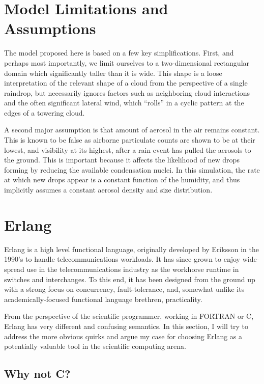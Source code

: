 \documentclass[twocolumn,a4paper,10pt]{article}
\begin{document}
\section{Model Limitations and Assumptions}

The model proposed here is based on a few key simplifications. First, and
perhaps most importantly, we limit ourselves to a two-dimensional rectangular
domain which significantly taller than it is wide. This shape is a loose
interpretation of the relevant shape of a cloud from the perspective of a single
raindrop, but necessarily ignores factors such as neighboring cloud
interactions and the often significant lateral wind, which ``rolls'' in a cyclic
pattern at the edges of a towering cloud.

A second major assumption is that amount of aerosol in the air remains constant.
This is known to be false as airborne particulate counts are shown to be at
their lowest, and visibility at its highest, after a rain event has pulled the
aerosols to the ground. This is important because it affects the likelihood of
new drops forming by reducing the available condensation nuclei. In this
simulation, the rate at which new drops appear is a constant function of the
humidity, and thus implicitly assumes a constant aerosol density and size
distribution.


\section{Erlang}

Erlang is a high level functional language, originally developed by Eriksson in
the 1990's to handle telecommunications workloads. It has since grown to enjoy
wide-spread use in the telecommunications industry as the workhorse runtime in
switches and interchanges. To this end, it has been designed from the ground up
with a strong focus on concurrency, fault-tolerance, and, somewhat unlike its
academically-focused functional language brethren, practicality.

From the perspective of the scientific programmer, working in FORTRAN or C,
Erlang has very different and confusing semantics. In this section, I will try
to address the more obvious quirks and argue my case for choosing Erlang as a
potentially valuable tool in the scientific computing arena.

\subsection{Why not C?}
\end{document}
